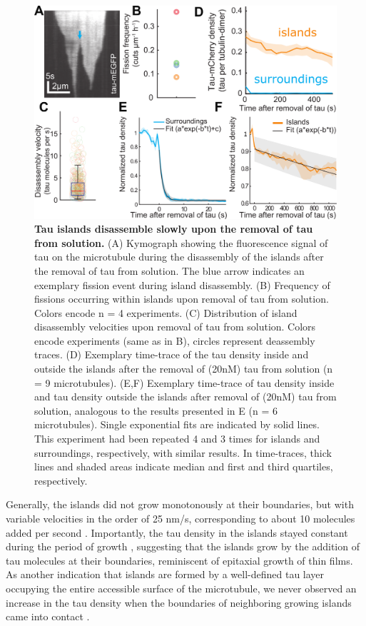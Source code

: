 \begin{figure}
	\centering
	\includegraphics[width=1\linewidth]{Figures/tauSHRINK.png}
	\caption[Tau islands disassemble slowly upon the removal of tau from solution.]{
	\textbf{Tau islands disassemble slowly upon the removal of tau from solution.} (A) Kymograph showing the fluorescence signal of tau on the microtubule during the disassembly of the islands after the removal of tau from solution. The blue arrow indicates an exemplary fission event during island disassembly. (B) Frequency of fissions occurring within islands upon removal of tau from solution. Colors encode n = 4 experiments. (C) Distribution of island disassembly velocities upon removal of tau from solution. Colors encode experiments (same as in B), circles represent deassembly traces. (D) Exemplary time-trace of the tau density inside and outside the islands after the removal of (20nM) tau from solution (n = 9 microtubules). (E,F) Exemplary time-trace of tau density inside and tau density outside the islands after removal of (20nM) tau from solution, analogous to the results presented in E (n = 6 microtubules). Single exponential fits are indicated by solid lines. This experiment had been repeated 4 and 3 times for islands and surroundings, respectively, with similar results. In time-traces, thick lines and shaded areas indicate median and first and third quartiles, respectively. 
		}\label{tauSHRINK}
\end{figure}
Generally, the islands did not grow monotonously at their boundaries, but with variable velocities in the order of 25 nm/s, corresponding to about 10 molecules added per second .  Importantly, the tau density in the islands stayed constant during the period of growth , suggesting that the islands grow by the addition of tau molecules at their boundaries, reminiscent of epitaxial growth of thin films. As another indication that islands are formed by a well-defined tau layer occupying the entire accessible surface of the microtubule, we never observed an increase in the tau density when the boundaries of neighboring growing islands came into contact .\par

